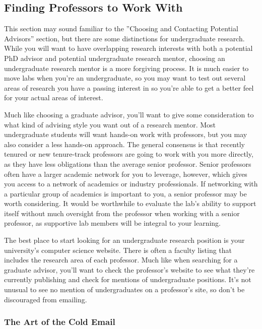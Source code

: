 \documentclass[12pt]{article}
\begin{document}
\subsection{Finding Professors to Work With} \label{choosingprof}

This section may sound familiar to the ”Choosing and Contacting Potential Advisors” section, but there are some distinctions for undergraduate research. While you will want to have overlapping research interests with both a potential PhD advisor and potential undergraduate research mentor, choosing an undergraduate research mentor is a more forgiving process. It is much easier to move labs when you’re an undergraduate, so you may want to test out several areas of research you have a passing interest in so you're able to get a better feel for your actual areas of interest.

Much like choosing a graduate advisor, you’ll want to give some consideration to what kind of advising style you want out of a research mentor. Most undergraduate students will want hands-on work with professors, but you may also consider a less hands-on approach. The general consensus is that recently tenured or new tenure-track professors are going to work with you more directly, as they have less obligations than the average senior professor. Senior professors often have a larger academic network for you to leverage, however, which gives you access to a network of academics or industry professionals. If networking with a particular group of academics is important to you, a senior professor may be worth considering. It would be worthwhile to evaluate the lab’s ability to support itself without much oversight from the professor when working with a senior professor, as supportive lab members will be integral to your learning. 

The best place to start looking for an undergraduate research position is your university's computer science website. There is often a faculty listing that includes the research area of each professor. Much like when searching for a graduate advisor, you'll want to check the professor's website to see what they're currently publishing and check for mentions of undergraduate positions. It's not unusual to see no mention of undergraduates on a professor's site, so don't be discouraged from emailing.

\subsubsection{The Art of the Cold Email}
\end{document}
